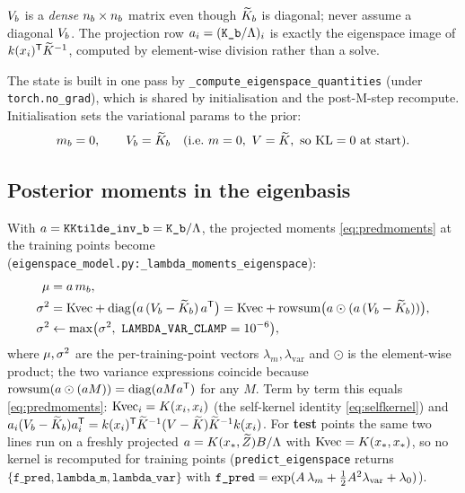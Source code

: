 \begin{remark}
$V_{b}$ is a \emph{dense} $n_{b}\times n_{b}$ matrix even though $\widetilde{K}_{b}$ is diagonal;
never assume a diagonal $V_{b}$. The projection row $a_i=(\texttt{K\_b}/\Lambda)_i$
is exactly the eigenspace image of $k(x_i)^{\mathsf{T}}\widetilde{K}^{-1}$, computed by
element-wise division rather than a solve.
\end{remark}

The state is built in one pass by
\texttt{\_compute\_eigenspace\_quantities} (under \texttt{torch.no\_grad}), which
is shared by initialisation and the post-M-step recompute. Initialisation sets
the variational params to the prior:
\begin{equation}
  m_{b}=0,\qquad V_{b}=\widetilde{K}_{b} \quad(\text{i.e.\ }m=0,\ V=\widetilde{K},\ \text{so } \mathrm{KL}=0\text{ at start}).
\end{equation}

\subsection{Posterior moments in the eigenbasis}\label{sec:eig-moments}

With $a=\texttt{KKtilde\_inv\_b}=\texttt{K\_b}/\Lambda$, the projected moments
\eqref{eq:predmoments} at the training points become
(\texttt{eigenspace\_model.py:\allowbreak \_lambda\_moments\_eigenspace}):
\begin{align}
  \pmean &= \amat\,\mb, \notag\\
  \pvar  &= \Kvec + \diago\!\big(\amat\,(\Vb-\Ktilb)\,\amat\transpose\big)
          = \Kvec + \operatorname{rowsum}\!\big(\amat\odot(\amat\,(\Vb-\Ktilb))\big), \notag\\
  \pvar  &\leftarrow \max\!\big(\pvar,\ \texttt{LAMBDA\_VAR\_CLAMP}=10^{-6}\big),
  \label{eq:eigmoments}
\end{align}
where $\mu,\sigma^{2}$ are the per-training-point vectors $\lambda_m,\lambda_{\mathrm{var}}$
and $\odot$ is the element-wise product; the two variance expressions coincide
because $\operatorname{rowsum}(a\odot(a M))=\operatorname{diag}(a Ma^{\mathsf{T}})$
for any $M$. Term by term this equals \eqref{eq:predmoments}: $\mathrm{Kvec}_i=K(x_i,x_i)$
(the self-kernel identity \eqref{eq:selfkernel}) and
$a_i(V_{b}-\widetilde{K}_{b})a_i^{\mathsf{T}}=k(x_i)^{\mathsf{T}}\widetilde{K}^{-1}(V-\widetilde{K})\widetilde{K}^{-1}k(x_i)$.
For \textbf{test} points the same two lines run on a freshly projected
$a=K(x_\ast,\widetilde{Z})B/\Lambda$ with $\mathrm{Kvec}=K(x_\ast,x_\ast)$, so no kernel
is recomputed for training points (\texttt{predict\_eigenspace} returns
$\{\texttt{f\_pred},\texttt{lambda\_m},\texttt{lambda\_var}\}$ with
$\texttt{f\_pred}=\exp(A\,\lambda_m+\tfrac12A^2\lambda_{\mathrm{var}}+\lambda_{0})$).

